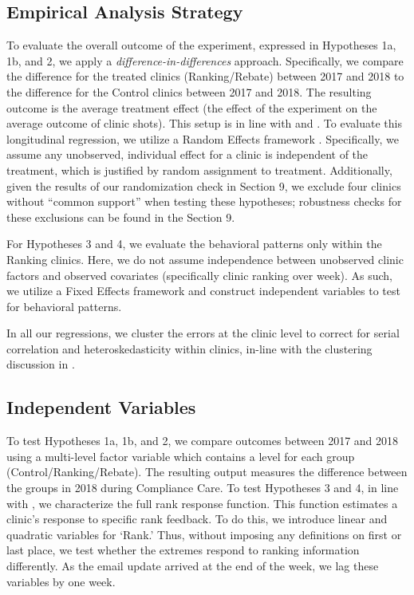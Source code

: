 \begin{onehalfspace}
 \subsection{Empirical Analysis Strategy} \label{emp_strat}
 To evaluate the overall outcome of the experiment, expressed in Hypotheses 1a, 1b, and 2, we apply a \textit{difference-in-differences} approach. Specifically, we compare the difference for the treated clinics (Ranking/Rebate) between 2017 and 2018 to the difference for the Control clinics between 2017 and 2018. The resulting outcome is the average treatment effect (the effect of the experiment on the average outcome of clinic shots). This setup is in line with \cite{Bertrand2004} and \cite{Wing2018}. To evaluate this longitudinal regression, we utilize a Random Effects framework \citep[as defined in][]{Wooldridge2010}. Specifically, we assume any unobserved, individual effect for a clinic is independent of the treatment, which is justified by random assignment to treatment. Additionally, given the results of our randomization check in Section 9, we exclude four clinics without “common support” when testing these hypotheses; robustness checks for these exclusions can be found in the Section 9.
 
 For Hypotheses 3 and 4, we evaluate the behavioral patterns only within the Ranking clinics. Here, we do not assume independence between unobserved clinic factors and observed covariates (specifically clinic ranking over week). As such, we utilize a Fixed Effects framework \citep[][]{Wooldridge2010} and construct independent variables to test for behavioral patterns.
 
 In all our regressions, we cluster the errors at the clinic level to correct for serial correlation and heteroskedasticity within clinics, in-line with the clustering discussion in \cite{Bertrand2004}. 
 
 \subsection{Independent Variables}
 To test Hypotheses 1a, 1b, and 2, we compare outcomes between 2017 and 2018 using a multi-level factor variable which contains a level for each group (Control/Ranking/Rebate). The resulting output measures the difference between the groups in 2018 during Compliance Care. To test Hypotheses 3 and 4, in line with \cite{Gill2019}, we characterize the full rank response function. This function estimates a clinic’s response to specific rank feedback. To do this, we introduce linear and quadratic variables for ‘Rank.’ Thus, without imposing any definitions on first or last place, we test whether the extremes respond to ranking information differently. As the email update arrived at the end of the week, we lag these variables by one week.
 

\end{onehalfspace}
